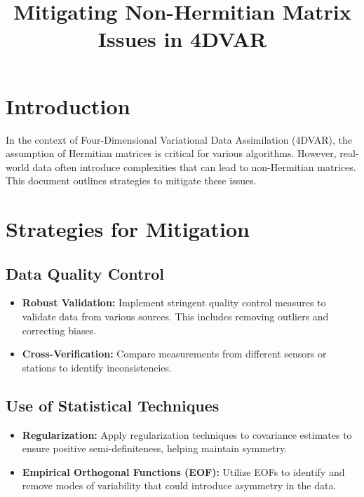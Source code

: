 \documentclass{article}
\title{Mitigating Non-Hermitian Matrix Issues in 4DVAR}
\author{}
\date{}
\begin{document}
\maketitle

\section{Introduction}

In the context of Four-Dimensional Variational Data Assimilation (4DVAR), the assumption of Hermitian matrices is critical for various algorithms. However, real-world data often introduce complexities that can lead to non-Hermitian matrices. This document outlines strategies to mitigate these issues.

\section{Strategies for Mitigation}

\subsection{Data Quality Control}

\begin{itemize}
    \item \textbf{Robust Validation:} Implement stringent quality control measures to validate data from various sources. This includes removing outliers and correcting biases.
    
    \item \textbf{Cross-Verification:} Compare measurements from different sensors or stations to identify inconsistencies.
\end{itemize}

\subsection{Use of Statistical Techniques}

\begin{itemize}
    \item \textbf{Regularization:} Apply regularization techniques to covariance estimates to ensure positive semi-definiteness, helping maintain symmetry.
    
    \item \textbf{Empirical Orthogonal Functions (EOF):} Utilize EOFs to identify and remove modes of variability that could introduce asymmetry in the data.
\end{itemize}
\end{document}
